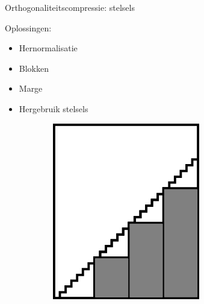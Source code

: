 \documentclass[t,12pt,dutch
\ifx\beamermode\undefined\else,\beamermode\fi
]{beamer}
\begin{document}
\begin{frame}{Orthogonaliteitscompressie: stelsels}

Oplossingen:
\begin{itemize}
\item Hernormalisatie
\item Blokken
\item Marge
\item Hergebruik stelsels
\end{itemize}

\begin{figure}[]
\centering
\begin{subfigure}{0.3\textwidth}
  \centering
  \includegraphics[width=0.9\linewidth]{images/orthogonality_compression2.png}
\end{subfigure}
\begin{subfigure}{0.3\textwidth}
  \centering

\end{subfigure}
\end{figure}
\end{frame}
\end{document}
